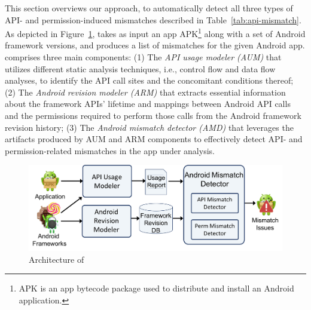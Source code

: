 
This section overviews our approach, 
to automatically detect all three types
of API- and permission-induced mismatches described in
Table~\ref{tab:api-mismatch}. As depicted in
Figure~\ref{fig:arch}, \@approach takes as input an app
APK\footnote{APK is an app bytecode package used to
distribute and install an Android application.} along
with a set of Android framework versions, and produces
a list of mismatches for the given Android app.  
\@approach comprises three main components:
(1) The \textit{API usage modeler (AUM)} that utilizes
different static analysis techniques, i.e., control
flow and data flow analyses, to  identify the API call
sites and the concomitant conditions thereof; 
(2) The \textit{Android revision modeler (ARM)} that
extracts essential information about the framework
APIs' lifetime and mappings between Android API calls
and the permissions required to perform those calls
from the Android framework revision history;
(3) The \textit{Android mismatch detector (AMD)} that
leverages the artifacts produced by AUM and ARM
components to effectively detect API- and
permission-related mismatches in the app under
analysis.

 

\begin{figure}[t!]
    \centering
    \includegraphics[width=\linewidth]{images/Approach.png}
    \vspace{-0.2cm}    
    \caption{Architecture of \@approach}
    \label{fig:arch}
    \vspace{-0.6cm}
\end{figure}

